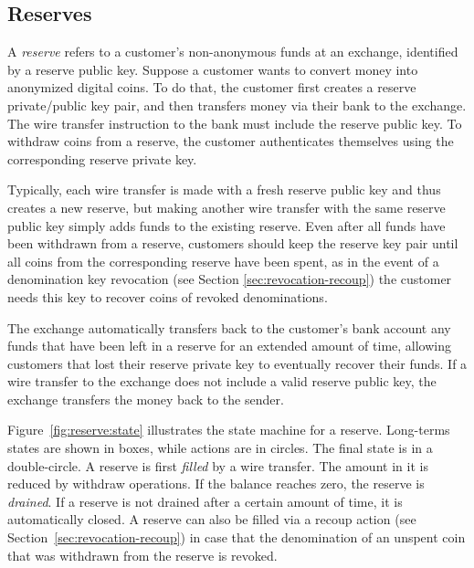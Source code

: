 
\subsection{Reserves}

A \emph{reserve} refers to a customer's non-anonymous funds at an exchange,
identified by a reserve public key.  Suppose a customer wants to convert money
into anonymized digital coins.  To do that, the customer first creates a
reserve private/public key pair, and then transfers money via their bank to the
exchange.  The wire transfer instruction to the bank must include the reserve
public key.  To withdraw coins from a reserve, the customer authenticates
themselves using the corresponding reserve private key.

Typically, each wire transfer is made with a fresh reserve public key and thus
creates a new reserve, but making another wire transfer with the same reserve
public key simply adds funds to the existing reserve.  Even after all funds
have been withdrawn from a reserve, customers should keep the reserve key pair
until all coins from the corresponding reserve have been spent, as in the event
of a denomination key revocation (see Section \ref{sec:revocation-recoup}) the
customer needs this key to recover coins of revoked denominations.

The exchange automatically transfers back to the customer's bank account any
funds that have been left in a reserve for an extended amount of time, allowing
customers that lost their reserve private key to eventually recover their
funds.  If a wire transfer to the exchange does not include a valid reserve public key,
the exchange transfers the money back to the sender.

Figure~\ref{fig:reserve:state} illustrates the state machine for a reserve.
Long-terms states are shown in boxes, while actions are in circles.  The final
state is in a double-circle.  A reserve is first {\em filled} by a wire
transfer. The amount in it is reduced by withdraw operations. If the balance
reaches zero, the reserve is {\em drained}. If a reserve is not drained after
a certain amount of time, it is automatically closed.  A reserve can also be
filled via a recoup action (see Section~\ref{sec:revocation-recoup}) in case
that the denomination of an unspent coin that was withdrawn from the reserve
is revoked.

